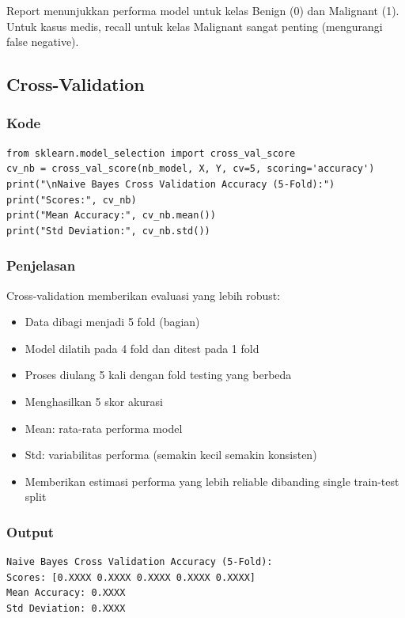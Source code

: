 \documentclass[12pt,a4paper]{article}
\begin{document}
Report menunjukkan performa model untuk kelas Benign (0) dan Malignant (1). Untuk kasus medis, recall untuk kelas Malignant sangat penting (mengurangi false negative).

\subsection{Cross-Validation}

\subsubsection{Kode}
\begin{lstlisting}[style=pythonstyle]
from sklearn.model_selection import cross_val_score
cv_nb = cross_val_score(nb_model, X, Y, cv=5, scoring='accuracy')
print("\nNaive Bayes Cross Validation Accuracy (5-Fold):")
print("Scores:", cv_nb)
print("Mean Accuracy:", cv_nb.mean())
print("Std Deviation:", cv_nb.std())
\end{lstlisting}

\subsubsection{Penjelasan}
Cross-validation memberikan evaluasi yang lebih robust:
\begin{itemize}
    \item Data dibagi menjadi 5 fold (bagian)
    \item Model dilatih pada 4 fold dan ditest pada 1 fold
    \item Proses diulang 5 kali dengan fold testing yang berbeda
    \item Menghasilkan 5 skor akurasi
    \item Mean: rata-rata performa model
    \item Std: variabilitas performa (semakin kecil semakin konsisten)
    \item Memberikan estimasi performa yang lebih reliable dibanding single train-test split
\end{itemize}

\subsubsection{Output}
\begin{verbatim}
Naive Bayes Cross Validation Accuracy (5-Fold):
Scores: [0.XXXX 0.XXXX 0.XXXX 0.XXXX 0.XXXX]
Mean Accuracy: 0.XXXX
Std Deviation: 0.XXXX
\end{verbatim}
\end{document}
